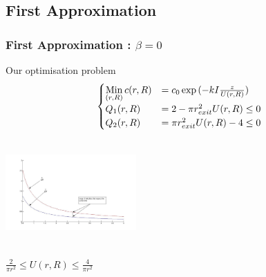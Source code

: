   \subsection{First Approximation}
  \begin{frame}
  \frametitle{First Approximation : $\beta = 0$}
  \begin{block}{Our optimisation problem}
$$ 
\begin{cases}
\mathop{\rm Min}\limits _{(r,R)} c(r,R) & = c_0 \exp{(-kI\frac{z}{U(r,R)})}\\
Q_1(r,R) & = 2-\pi r_{exit}^2U(r,R) \leq 0 \\
Q_2(r,R) & = \pi r_{exit}^2U(r,R) - 4 \leq 0
\end{cases}
$$
  \end{block}
\includegraphics[height=4cm, width=5cm]{images/vrange.jpg}
\hspace{0.2cm}
\begin{minipage}{5cm}
$\frac{2}{\pi r^2} \leq U(r,R) \leq \frac{4}{\pi r^2}$
\end{minipage}
  \end{frame}


